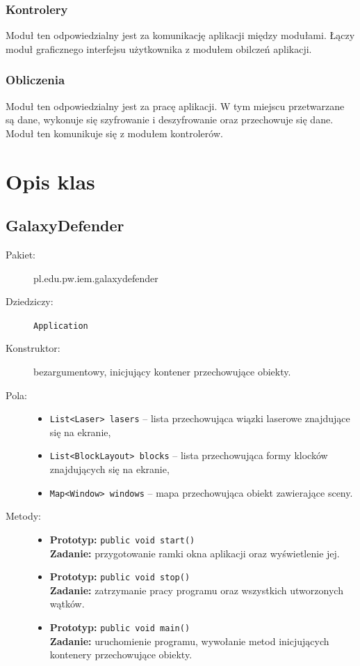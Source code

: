 \documentclass[a4paper]{article}
\newcommand{\prog}{\texttt}
\begin{document}
\subsubsection{Kontrolery}
Moduł ten odpowiedzialny jest za komunikację aplikacji między modułami. Łączy moduł graficznego interfejsu użytkownika z modułem obilczeń aplikacji.

\subsubsection{Obliczenia}
Moduł ten odpowiedzialny jest za pracę aplikacji. W tym miejscu przetwarzane są dane, wykonuje się szyfrowanie i deszyfrowanie oraz przechowuje się dane. Moduł ten komunikuje się z modułem kontrolerów.

\section{Opis klas}
\subsection{GalaxyDefender}
\begin{description}
    \item[Pakiet:] pl.edu.pw.iem.galaxydefender
    \item[Dziedziczy:] \prog{Application}
    \item[Konstruktor:] bezargumentowy, inicjujący kontener przechowujące obiekty.
    \item[Pola:] \hfill
    \begin{itemize}
        \item \prog{List<Laser> lasers} -- lista przechowująca wiązki laserowe znajdujące się na ekranie,
        \item \prog{List<BlockLayout> blocks} -- lista przechowująca formy klocków znajdujących się na ekranie,
        \item \prog{Map<Window> windows} -- mapa przechowująca obiekt zawierające sceny.
    \end{itemize}
    \item[Metody:] \hfill
    \begin{itemize}
        \item \textbf{Prototyp:} \prog{public void start()}\\\textbf{Zadanie:} przygotowanie ramki okna aplikacji oraz wyświetlenie jej.
        \item \textbf{Prototyp:} \prog{public void stop()}\\\textbf{Zadanie:} zatrzymanie pracy programu oraz wszystkich utworzonych wątków.
        \item \textbf{Prototyp:} \prog{public void main()}\\\textbf{Zadanie:} uruchomienie programu, wywołanie metod inicjujących kontenery przechowujące obiekty.
    \end{itemize} 
\end{description}
\end{document}
